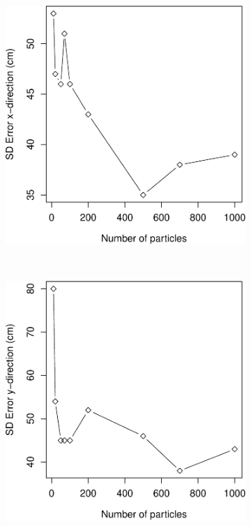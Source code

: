 \documentclass[11pt]{report}
\begin{document}
\begin{figure}[H]
\begin{subfigure}[b]{0.45\textwidth}
  \end{subfigure}
  \begin{subfigure}[b]{0.45\textwidth}
  \includegraphics[width=1\textwidth]{SD_x_particles-crop}
  \end{subfigure}%
~
  \begin{subfigure}[b]{0.45\textwidth}
  \includegraphics[width=1\textwidth]{SD_y_particles-crop}

\end{subfigure}
\end{figure}
\end{document}
